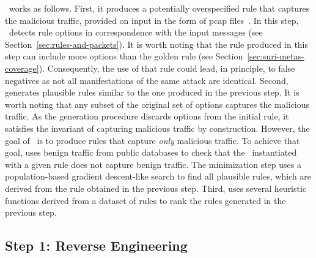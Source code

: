 \documentclass[sigconf,anonymous]{acmart}
\begin{document}
\tname\ works as follows. First, it produces a potentially
overspecified rule that captures the malicious traffic, provided on
input in the form of pcap files~\cite{pcap}. In this step,
\tname\ detects rule options in correspondence with the input messages
(see Section~\ref{sec:rules-and-packets}). It is worth noting that the
rule produced in this step can include more options than the golden
rule (see Section~\ref{sec:suri-metas-coverage}). Consequently, the
use of that rule could lead, in principle, to false negatives as not
all manifestations of the same attack are identical. Second, \tname{}
generates plausible rules similar to the one produced in the previous
step. It is worth noting that any subset of the original set of
options captures the malicious traffic. As the generation procedure
discards options from the initial rule, it satisfies the invariant of
capturing malicious traffic by construction. However, the goal of
\tname\ is to produce rules that capture \emph{only} malicious
traffic. To achieve that goal, \tname{} uses benign traffic from
public databases to check that the \nids\ instantiated with a given
rule does not capture benign traffic. The minimization step uses a
population-based gradient descent-like search to find all plausible
rules, which are derived from the rule obtained in the previous
step. Third, uses several heuristic functions derived from a dataset
of rules to rank the rules generated in the previous step.






\subsection{Step 1: Reverse Engineering}
\end{document}
